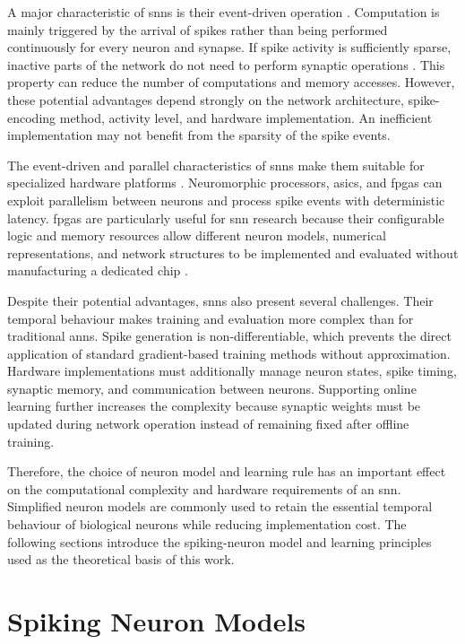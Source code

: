 A major characteristic of \gls{snn}s is their event-driven operation \cite{Davis2018,Maass1997}. Computation is mainly triggered by the arrival of spikes rather than being performed continuously for every neuron and synapse. If spike activity is sufficiently sparse, inactive parts of the network do not need to perform synaptic operations \cite{Davis2018}. This property can reduce the number of computations and memory accesses. However, these potential advantages depend strongly on the network architecture, spike-encoding method, activity level, and hardware implementation. An inefficient implementation may not benefit from the sparsity of the spike events.

The event-driven and parallel characteristics of \gls{snn}s make them suitable for specialized hardware platforms \cite{Carpegna2025}. Neuromorphic processors, \gls{asic}s, and \gls{fpga}s can exploit parallelism between neurons and process spike events with deterministic latency. \Glspl{fpga} are particularly useful for \gls{snn} research because their configurable logic and memory resources allow different neuron models, numerical representations, and network structures to be implemented and evaluated without manufacturing a dedicated chip \cite{Carpegna2022}.

Despite their potential advantages, \gls{snn}s also present several challenges. Their temporal behaviour makes training and evaluation more complex than for traditional \gls{ann}s. Spike generation is non-differentiable, which prevents the direct application of standard gradient-based training methods without approximation. Hardware implementations must additionally manage neuron states, spike timing, synaptic memory, and communication between neurons. Supporting online learning further increases the complexity because synaptic weights must be updated during network operation instead of remaining fixed after offline training.

Therefore, the choice of neuron model and learning rule has an important effect on the computational complexity and hardware requirements of an \gls{snn}. Simplified neuron models are commonly used to retain the essential temporal behaviour of biological neurons while reducing implementation cost. The following sections introduce the spiking-neuron model and learning principles used as the theoretical basis of this work.

\section{Spiking Neuron Models}
\label{subsec: spiking neuron models}

